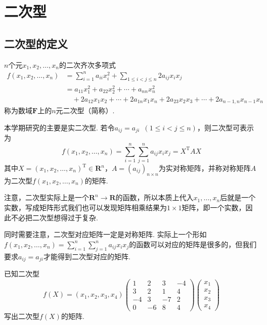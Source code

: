 \chapter{二次型}

\section{二次型的定义}

\begin{definition}[二次型] 
    $n$个元$x_1,x_2,\ldots,x_n$的二次齐次多项式
    \begin{align*}
        f(x_1,x_2,\ldots,x_n) & = \sum_{i=1}^{n}a_{ii}x_i^2+\sum\limits_{1\leqslant i<j\leqslant n}2a_{ij}x_ix_j    \\
                              & = a_{11}x_1^2+a_{22}x_2^2+\cdots+a_{nn}x_n^2                                        \\
                              & \quad +2a_{12}x_1x_2+\cdots+2a_{1n}x_1x_n+2a_{23}x_2x_3+\cdots+2a_{n-1,n}x_{n-1}x_n
    \end{align*}
    称为数域$\mathbf{F}$上的$n$元二次型（简称）.
\end{definition}
本学期研究的主要是实二次型. 若令$a_{ij}=a_{ji}\enspace(1\leqslant i<j\leqslant n)$，则二次型可表示为
\[f(x_1,x_2,\ldots,x_n)=\sum_{i=1}^{n}\sum_{j=1}^{n}a_{ij}x_ix_j=X^\mathrm{T}AX\]
其中$X=(x_1,x_2,\ldots,x_n)^\mathrm{T}\in\mathbf{R}^n$，$A=(a_{ij})_{n\times n}$为实对称矩阵，并称对称矩阵$A$为二次型$f(x_1,x_2,\ldots,x_n)$的矩阵.

注意，二次型实际上是一个$\mathbf{R}^n\to\mathbf{R}$的函数，所以本质上代入$x_1,\ldots,x_n$后就是一个实数，写成矩阵形式我们也可以发现矩阵相乘结果为$1\times 1$矩阵，即一个实数，因此不必把二次型想得过于复杂.

同时需要注意，二次型对应矩阵一定是对称矩阵. 实际上一个形如$f(x_1,x_2,\ldots,x_n)=\displaystyle\sum_{i=1}^{n}\displaystyle\sum_{j=1}^{n}a_{ij}x_ix_j$的函数可以对应的矩阵是很多的，但我们要求$a_{ij}=a_{ji}$才能得到二次型对应的矩阵.
\begin{example}
    已知二次型
    \[f(X)=(x_1,x_2,x_3,x_4)\begin{pmatrix}
            1 & 2 & 3 & -4 \\ 3 & 2 & 1 & 4 \\ -4 & 3 & -7 & 2 \\ 0 & -6 & 8 & 4
        \end{pmatrix}\begin{pmatrix}
            x_1 \\ x_2 \\ x_3 \\ x_4
        \end{pmatrix}\]
    写出二次型$f(X)$的矩阵.
\end{example}

